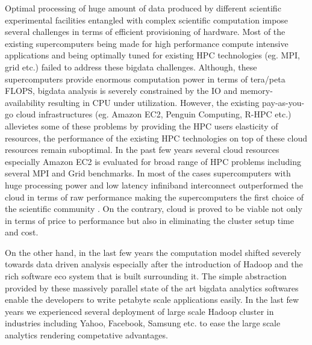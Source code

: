 Optimal processing of huge amount of data produced by different scientific experimental facilities entangled with complex scientific computation impose several challenges in terms of efficient provisioning of hardware.
Most of the existing supercomputers being made for high performance compute intensive applications and being optimally tuned for existing HPC technologies (eg. MPI, grid etc.) failed to address these bigdata challenges.
Although, these supercomputers provide enormous computation power in terms of tera/peta FLOPS, bigdata analysis is severely constrained by the IO and memory-availability resulting in CPU under utilization.
However, the existing pay-as-you-go cloud infrastructures (eg. Amazon EC2, Penguin Computing, R-HPC etc.) allevietes some of these problems by providing the HPC users elasticity of resources, the performance of the existing HPC technologies on top of these cloud resources remain suboptimal.
In the past few years several cloud resources especially Amazon EC2 is evaluated for broad range of HPC problems including several MPI and Grid benchmarks. 
In most of the cases supercomputers with huge processing power and low latency infiniband interconnect outperformed the cloud in terms of raw performance making the supercomputers the first choice of the scientific community . 
On the contrary, cloud is proved to be viable not only in terms of price to performance but also in eliminating the cluster setup time and cost.

On the other hand, in the last few years the computation model shifted severely towards data driven analysis especially after the introduction of Hadoop and the rich software eco system that is built surrounding it.
The simple abstraction provided by these massively parallel state of the art bigdata analytics softwares enable the developers to write petabyte scale applications easily.
In the last few years we experienced several deployment of large scale Hadoop cluster in industries including Yahoo, Facebook, Samsung etc. to ease the large scale analytics rendering competative advantages.

